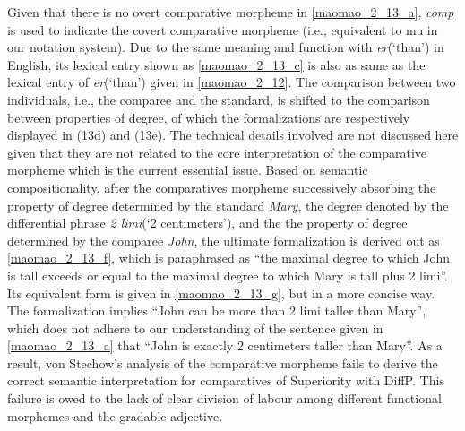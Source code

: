 \documentclass{ctexart}
\begin{document}
Given that there is no overt comparative morpheme in \ref{maomao_2_13_a}, \textit{comp} is used to indicate the covert comparative morpheme (i.e., equivalent to mu in our notation system). Due to the same meaning and function with \textit{er}(`than') in English, its lexical entry shown as \ref{maomao_2_13_c} is also as same as the lexical entry of \textit{er}(`than') given in \ref{maomao_2_12}. The comparison between two individuals, i.e., the comparee and the standard, is shifted to the comparison between properties of degree, of which the formalizations are respectively displayed in (13d) and (13e). The technical details involved are not discussed here given that they are not related to the core interpretation of the comparative morpheme which is the current essential issue. Based on semantic compositionality, after the comparatives morpheme successively absorbing the property of degree determined by the standard \textit{Mary}, the degree denoted by the differential phrase \textit{2 limi}(`2 centimeters'), and the the property of degree determined by the comparee \textit{John}, the ultimate formalization is derived out as \ref{maomao_2_13_f}, which is paraphrased as ``the maximal degree to which John is tall exceeds or equal to the maximal degree to which Mary is tall plus 2 limi''. Its equivalent form is given in \ref{maomao_2_13_g}, but in a more concise way. The formalization implies ``John can be more than 2 limi taller than Mary'', which does not adhere to our understanding of the sentence given in \ref{maomao_2_13_a} that ``John is exactly 2 centimeters taller than Mary''. As a result, von Stechow's analysis of the comparative morpheme fails to derive the correct semantic interpretation for comparatives of Superiority with DiffP. This failure is owed to the lack of clear division of labour among different functional morphemes and the gradable adjective.
\end{document}
